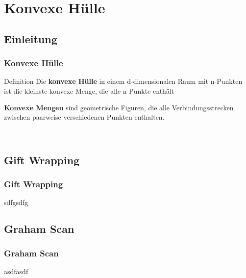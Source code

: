 \section{Konvexe Hülle}
\subsection{Einleitung}
\begin{frame}
	\frametitle{{Konvexe Hülle}}
	\begin{block} {Definition}
	Die \textbf{konvexe Hülle} in einem d-dimensionalen Raum mit n-Punkten ist die kleinste konvexe Menge, die alle n Punkte enthält
	\end{block}
	\pause
	\textbf{Konvexe Mengen} sind geometrische Figuren, die alle Verbindungsstrecken zwischen paarweise verschiedenen Punkten enthalten.
	\pause	
	\begin{figure}
		\mbox{
			\quad
			\hspace{1cm}
			\quad
			\hspace{1cm}
		}
	\end{figure}
	
\end{frame}
\subsection{Gift Wrapping}
\begin{frame}
	\frametitle{{Gift Wrapping}}
	sdfgsdfg
\end{frame}
\subsection{Graham Scan}
\begin{frame}
	\frametitle{{Graham Scan}}
	asdfasdf
\end{frame}